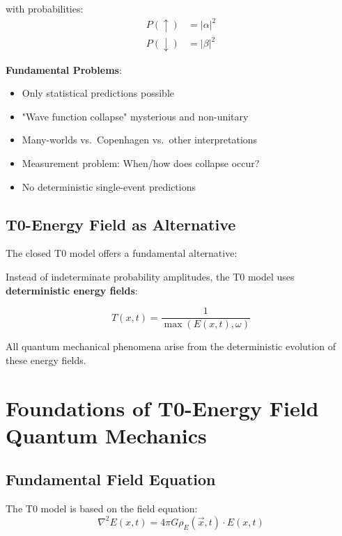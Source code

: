 \documentclass[12pt,a4paper]{article}
\newcommand{\Tfield}{T(x,t)}
\newcommand{\Efield}{E(x,t)}
\begin{document}
	with probabilities:
	\begin{align}
		P(\uparrow) &= |\alpha|^2 \\
		P(\downarrow) &= |\beta|^2
	\end{align}
	
	\textbf{Fundamental Problems}:
	\begin{itemize}
		\item Only statistical predictions possible
		\item "Wave function collapse" mysterious and non-unitary
		\item Many-worlds vs.~Copenhagen vs.~other interpretations
		\item Measurement problem: When/how does collapse occur?
		\item No deterministic single-event predictions
	\end{itemize}
	
	\subsection{T0-Energy Field as Alternative}
	
	The closed T0 model offers a fundamental alternative:
	
	\begin{tcolorbox}[colback=blue!5!white,colframe=blue!75!black,title=T0 Fundamental Principle]
		Instead of indeterminate probability amplitudes, the T0 model uses \textbf{deterministic energy fields}:
		
		\begin{equation}
			\boxed{\Tfield = \frac{1}{\max(\Efield, \omega)}}
		\end{equation}
		
		All quantum mechanical phenomena arise from the deterministic evolution of these energy fields.
	\end{tcolorbox}
	
	\section{Foundations of T0-Energy Field Quantum Mechanics}
	
	\subsection{Fundamental Field Equation}
	
	The T0 model is based on the field equation:
	\begin{equation}
		\nabla^2 \Efield = 4\pi G \rho_E(\vec{x},t) \cdot \Efield
		\label{eq:energy_field_equation}
	\end{equation}
	
\end{document}
